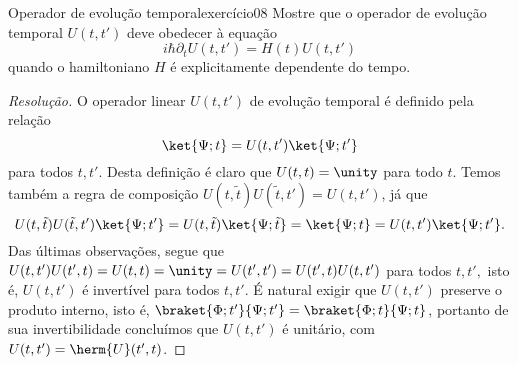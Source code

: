 \begin{exercício}{Operador de evolução temporal}{exercício08}
    Mostre que o operador de evolução temporal \(U(t, t')\) deve obedecer à equação
    \begin{equation*}
        i \hbar \partial_t U(t, t') = H(t) U(t, t')
    \end{equation*}
    quando o hamiltoniano \(H\) é explicitamente dependente do tempo.
\end{exercício}
\begin{proof}[Resolução]
    O operador linear \(U(t,t')\) de evolução temporal é definido pela relação 
    \begin{equation*}
        \ket{\Psi; t} = U(t, t') \ket{\Psi; t'}
    \end{equation*}
    para todos \(t, t'.\) Desta definição é claro que \(U(t, t) = \unity\) para todo \(t\). Temos também a regra de composição \(U(t, \tilde{t}) U(\tilde{t}, t') = U(t, t')\), já que
    \begin{equation*}
        U(t, \tilde{t}) U(\tilde{t}, t') \ket{\Psi; t'} = U(t, \tilde{t}) \ket{\Psi; \tilde{t}} = \ket{\Psi; t} = U(t, t') \ket{\Psi; t'}.
    \end{equation*}
    Das últimas observações, segue que \(U(t, t') U(t', t) = U(t, t) = \unity = U(t',t') = U(t', t) U(t, t')\) para todos \(t, t',\) isto é, \(U(t, t')\) é invertível para todos \(t, t'.\) É natural exigir que \(U(t, t')\) preserve o produto interno, isto é, \(\braket{\Phi; t'}{\Psi; t'} = \braket{\Phi; t}{\Psi; t}\), portanto de sua invertibilidade concluímos que \(U(t, t')\) é unitário, com \(U(t, t') = \herm{U}(t', t)\).


\end{proof}
